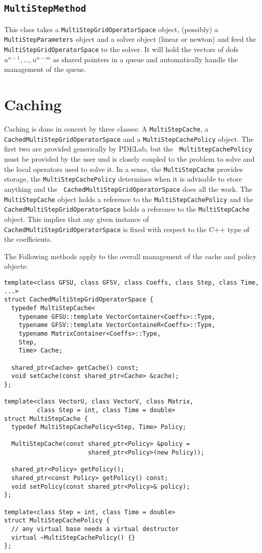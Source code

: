 \documentclass[11pt,a4paper,DIV11,%
notitlepage,oneside,abstracton,%
bibtotoc]{scrartcl}
\begin{document}
\subsection{\tt MultiStepMethod}

This class takes a {\tt MultiStepGridOperatorSpace} object, (possibly) a {\tt
  MultiStepParameters} object and a solver object (linear or newton) and feed
the {\tt MultiStepGridOperatorSpace} to the solver.  It will hold the vectors
of dofs $u^{n-1},\ldots,u^{n-m}$ as shared pointers in a queue and
automatically handle the management of the queue.

\section{Caching}

Caching is done in concert by three classes: A {\tt MultiStepCache}, a {\tt
  Cached\-Multi\-Step\-Grid\-Operator\-Space} and a {\tt MultiStepCachePolicy}
object.  The first two are provided generically by PDELab, but the {\tt
  MultiStepCachePolicy} must be provided by the user und is closely coupled to
the problem to solve and the local operators used to solve it.  In a sense,
the {\tt MultiStepCache} provides storage, the {\tt MultiStepCachePolicy}
determines when it is advisable to store anything and the {\tt
  Cached\-Multi\-Step\-Grid\-Operator\-Space} does all the work.  The {\tt
  MultiStepCache} object holds a reference to the {\tt MultiStepCachePolicy}
and the {\tt Cached\-Multi\-Step\-Grid\-Operator\-Space} holds a reference to
the {\tt MultiStepCache} object.  This implies that any given instance of {\tt
  Cached\-Multi\-Step\-Grid\-Operator\-Space} is fixed with respect to the C++
type of the coefficients.

The Following methods apply to the overall management of the cache and policy
objects:
\begin{lstlisting}
template<class GFSU, class GFSV, class Coeffs, class Step, class Time, ...>
struct CachedMultiStepGridOperatorSpace {
  typedef MultiStepCache<
    typename GFSU::template VectorContainer<Coeffs>::Type,
    typename GFSV::template VectorContaineR<Coeffs>::Type,
    typename MatrixContainer<Coeffs>::Type,
    Step,
    Time> Cache;

  shared_ptr<Cache> getCache() const;
  void setCache(const shared_ptr<Cache> &cache);
};

template<class VectorU, class VectorV, class Matrix,
         class Step = int, class Time = double>
struct MultiStepCache {
  typedef MultiStepCachePolicy<Step, Time> Policy;

  MultiStepCache(const shared_ptr<Policy> &policy = 
                       shared_ptr<Policy>(new Policy));

  shared_ptr<Policy> getPolicy();
  shared_ptr<const Policy> getPolicy() const;
  void setPolicy(const shared_ptr<Policy>& policy);
};

template<class Step = int, class Time = double>
struct MultiStepCachePolicy {
  // any virtual base needs a virtual destructor
  virtual ~MultiStepCachePolicy() {}
};
\end{lstlisting}
\end{document}
